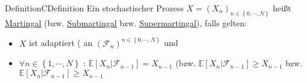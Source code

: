 \begin{ibox}[4.1]{Definition}{CDefinition}
	Ein stochastischer Prozess $ X = \left( X_n \right)_{n \in \left\{  0 , \cdots, N \right\}} $ heißt \underline{Martingal} (bzw.
	\underline{Submartingal} bzw. \underline{Supermartingal}), falls gelten: 
	\begin{itemize}
		\item $ X $ ist adaptiert ( an $ \left( \mathcal{F}_{n} \right)^{n \in \left\{ 0 , \cdots, N \right\}} $ und 
		\item $ \forall n \in \left\{  1 , \cdots, N \right\} $ : $ \mathbb{E} \left[ X_n | \mathcal{F}_{n-1} \right] = X_{n-1} $ (bzw. 
			$ \mathbb{E} \left[ X_n | \mathcal{F}_{n-1} \right] \geq  X_{n-1}$ bzw. $ \mathbb{E} \left[ X_n | \mathcal{F}_{n-1} \right] \geq X_{n-1} $ 
	\end{itemize}
\end{ibox}

